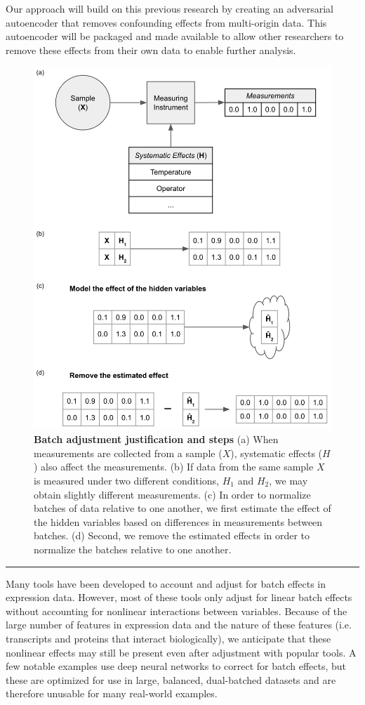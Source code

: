 \documentclass[notitlepage]{article}
\begin{document}
Our approach will build on this previous research by creating an adversarial autoencoder that removes confounding effects from multi-origin data.
This autoencoder will be packaged and made available to allow other researchers to remove these effects from their own data to enable further analysis.

\begin{figure}
	\centering
	\includegraphics[width=4.5in]{figures/rough/adjuster_workflow}
	\caption{\textbf{Batch adjustment justification and steps}
	(a) When measurements are collected from a sample ($X$), systematic effects ($H$) also affect the measurements.
	(b) If data from the same sample $X$ is measured under two different conditions, $H_1$ and $H_2$, we may obtain slightly different measurements.
	(c) In order to normalize batches of data relative to one another, we first estimate the effect of the hidden variables based on differences in measurements between batches.
	(d) Second, we remove the estimated effects in order to normalize the batches relative to one another.}
	\label{fig:workflow}
\end{figure}

\noindent\rule{\textwidth}{1pt}

Many tools have been developed to account and adjust for batch effects in expression data.
However, most of these tools only adjust for linear batch effects without accounting for nonlinear interactions between variables.
Because of the large number of features in expression data and the nature of these features (i.e. transcripts and proteins that interact biologically), we anticipate that these nonlinear effects may still be present even after adjustment with popular tools.
A few notable examples \cite{shaham_removal_2017,shaham_batch_2018} use deep neural networks to correct for batch effects, but these are optimized for use in large, balanced, dual-batched datasets and are therefore unusable for many real-world examples.
\end{document}
